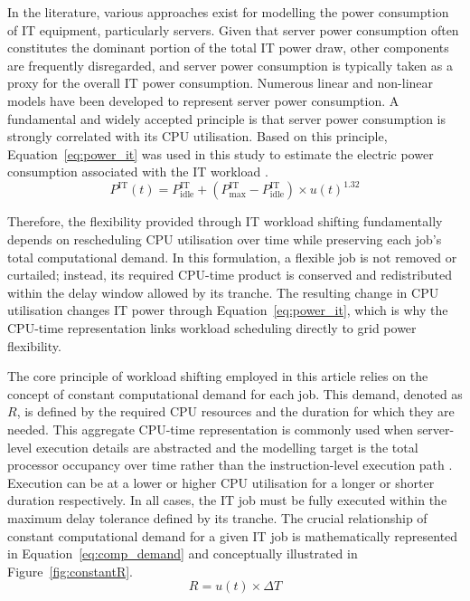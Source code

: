 \documentclass[lettersize,journal]{IEEEtran}
\newcommand{\rev}[1]{\textcolor{blue!70!black}{#1}}
\begin{document}
 In the literature, various approaches exist for modelling the power consumption of IT equipment, particularly servers. Given that server power consumption often constitutes the dominant portion of the total IT power draw, other components are frequently disregarded, and server power consumption is typically taken as a proxy for the overall IT power consumption. Numerous linear and non-linear models have been developed to represent server power consumption. A fundamental and widely accepted principle is that server power consumption is strongly correlated with its CPU utilisation. \rev{Based on this principle,} Equation~\ref{eq:power_it} was used in this study to estimate the electric power consumption associated with the IT workload \cite{dayarathna2015data,v2015analysis}.
\begin{equation}
P^{\mathrm{IT}}(t) = P^{\mathrm{IT}}_{\mathrm{idle}} + (P^{\mathrm{IT}}_{\mathrm{max}} - P^{\mathrm{IT}}_{\mathrm{idle}}) \times u(t)^{1.32}
\label{eq:power_it}
\end{equation}



\rev{Therefore, the flexibility provided through IT workload shifting fundamentally depends on rescheduling CPU utilisation over time while preserving each job's total computational demand. In this formulation, a flexible job is not removed or curtailed; instead, its required CPU-time product is conserved and redistributed within the delay window allowed by its tranche. The resulting change in CPU utilisation changes IT power through Equation~\ref{eq:power_it}, which is why the CPU-time representation links workload scheduling directly to grid power flexibility.}

The core principle of workload shifting employed in this article relies on the concept of constant computational demand for each job. This demand, denoted as $R$, is defined by the required CPU resources and the duration for which they are needed. \rev{This aggregate CPU-time representation is commonly used when server-level execution details are abstracted and the modelling target is the total processor occupancy over time rather than the instruction-level execution path \cite{dayarathna2015data,v2015analysis,6779441}.} Execution can be at a lower or higher CPU utilisation for a longer or shorter duration respectively. In all cases, the IT job must be fully executed within the maximum delay tolerance defined by its tranche. The crucial relationship of constant computational demand for a given IT job is mathematically represented in Equation~\ref{eq:comp_demand} and conceptually illustrated in Figure~\ref{fig:constantR}.
\begin{equation}
R = u(t) \times \Delta T
\label{eq:comp_demand}
\end{equation}
\end{document}
